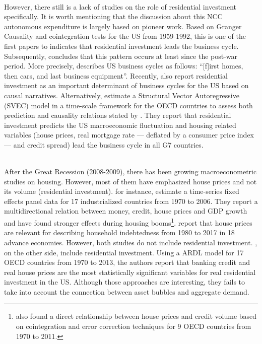 \documentclass[11pt]{article}
\begin{document}
\\
However, there still is a lack of studies on the role of residential investment specifically.
It is worth mentioning that the discussion about this NCC autonomous expenditure is largely based on \textcite{green_follow_1997} pioneer work.
Based on Granger Causality and cointegration tests for the US from 1959-1992, this is one of the first papers to indicates that residential investment leads the business cycle.
Subsequently, \textcite{leamer_housing_2007} concludes that this pattern occurs at least since the post-war period.
More precisely,  \textcite[p.~8]{leamer_housing_2007} describes US business cycles as follows: ``[f]irst homes, then cars,
and last business equipment''.
Recently, \textcites{fiebiger_semi-autonomous_2018}{fiebiger_trend_2017} also report residential investment as an important determinant of business cycles for the US based on causal narratives.
Alternatively, \textcite{huang_is_2020} estimate a Structural Vector Autoregressive (SVEC) model in a time-scale framework for the OECD countries to assess both prediction and causality relations stated by \textcite{leamer_housing_2007}.
They report that residential investment predicts the US  macroeconomic fluctuation and housing related variables (house prices, real mortgage rate --- deflated by a consumer price index --- and credit spread) lead the business cycle in all G7 countries.

\\
After the Great Recession (2008-2009), there has been growing macroeconometric studies on housing.
However, most of them have emphasized house prices and not its volume (residential investment).
\textcite{goodhart_house_2008} for instance, estimate a time-series fixed effects panel data for 17 industrialized countries from 1970 to 2006. They report a multidirectional relation between money, credit, house prices and GDP growth and have found stronger effects during housing booms\footnote{\textcite{Arestis_Bank_2014} also found a  direct relationship between house prices and credit volume based on cointegration and error correction techniques for 9 OECD countries from 1970 to 2011.}. 
\textcite{wood_house_2020} report that house prices are relevant for describing household indebtedness from 1980 to 2017 in 18 advance economies.
However, both studies do not include residential investment.
\textcite{Arestis_Residential_2014}, on the other side, include residential investment. Using a ARDL model for 17 OECD countries from 1970 to 2013, the authors report that banking credit and real house prices are the most statistically significant variables for real residential investment in the US.
Although those approaches are interesting, they fails to take into account the connection between asset bubbles and aggregate demand.
\end{document}
